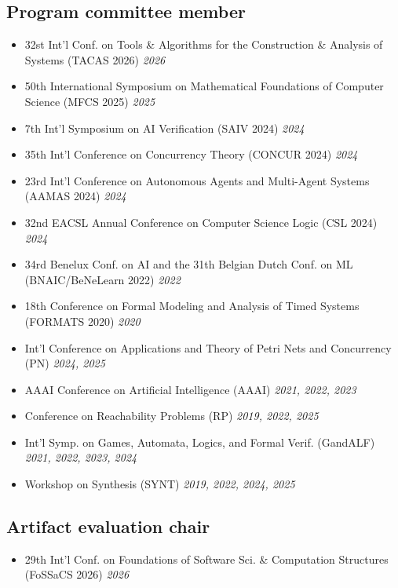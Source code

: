 \documentclass[10pt,a4paper]{moderncv}
\begin{document}
\subsection{Program committee member}
\begin{itemize}
  \item 32st Int'l Conf. on Tools \& Algorithms for the
    Construction \& Analysis of Systems (TACAS 2026) \hfill \textit{2026}
  \item 50th International Symposium on Mathematical Foundations of Computer
    Science (MFCS 2025) \hfill \textit{2025}
  \item 7th Int'l Symposium on AI Verification (SAIV 2024) \hfill
    \textit{2024}
  \item 35th Int'l Conference on Concurrency Theory (CONCUR 2024) \hfill
    \textit{2024}
  \item 23rd Int'l Conference on Autonomous Agents and Multi-Agent
    Systems (AAMAS 2024) \hfill \textit{2024}
  \item 32nd EACSL Annual Conference on Computer Science Logic (CSL 2024)
    \hfill \textit{2024}
  \item 34rd Benelux Conf. on AI and the 31th
    Belgian Dutch Conf. on ML (BNAIC/BeNeLearn 2022) \hfill \textit{2022}
  \item 18th Conference on Formal Modeling and Analysis of Timed
    Systems (FORMATS 2020) \hfill \textit{2020}
  \item Int'l Conference on Applications and Theory of Petri Nets
    and Concurrency (PN) \hfill \textit{2024, 2025}
  \item AAAI Conference on Artificial Intelligence (AAAI) \hfill
    \textit{2021, 2022, 2023}
  \item Conference on Reachability Problems (RP) \hfill \textit{2019, 2022,
    2025}
  \item Int'l Symp. on Games, Automata, Logics, and Formal
    Verif. (GandALF) \hfill \textit{2021, 2022, 2023, 2024}
  \item Workshop on Synthesis (SYNT) \hfill \textit{2019, 2022, 2024, 2025}
\end{itemize}

\subsection{Artifact evaluation chair}
\begin{itemize}
  \item 29th Int'l Conf. on Foundations of Software Sci. \&
    Computation Structures (FoSSaCS 2026) \hfill \textit{2026}
\end{itemize}
\end{document}
